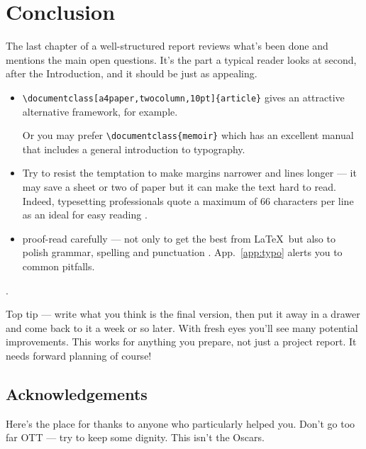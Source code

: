 \chapter{Conclusion}\label{andfinally}
The last chapter of a well-structured report reviews what's been done and
mentions the main open questions.  It's the part a typical reader looks
at second, after the Introduction, and it should be just as appealing.
\begin{itemize}
    \item\verb+\documentclass[a4paper,twocolumn,10pt]{article}+
    gives an attractive alternative framework, for example.\par Or you
may prefer \verb+\documentclass{memoir}+ which has an excellent
manual \cite{MEM} that includes a general introduction to typography.
    \item Try to resist the temptation to make margins narrower
    and lines longer --- it may save a sheet or two of paper but it
    can make the text hard to read. Indeed, typesetting professionals
    quote a maximum of 66 characters per line as an ideal for easy reading
          \cite[Sec.~5.2.2]{NSS}.
    \item proof-read carefully --- not only to get the best from \LaTeX\
but also to polish grammar, spelling and punctuation \cite{ESL}.
App.~\ref{app:typo} alerts you to common pitfalls.
\end{itemize}.
\par
Top tip --- write what you think is the final version, then put it
away in a drawer and come back to it a week or so later. With fresh
eyes you'll see many potential improvements. This works for anything you
prepare, not just a project report. It needs forward planning of
course!
\section*{Acknowledgements}
Here's the place for thanks to anyone who particularly helped you.
Don't go too far OTT --- try to keep some dignity. This isn't the
Oscars.

